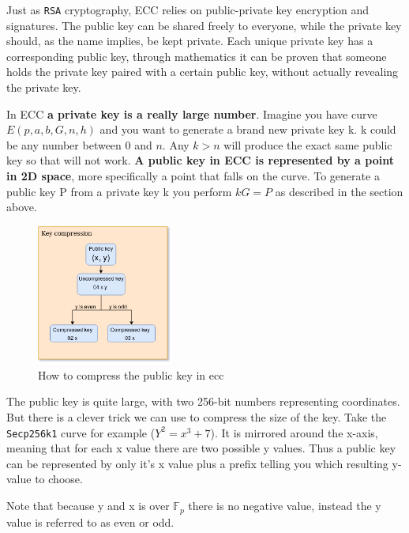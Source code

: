 Just as \texttt{RSA} cryptography, ECC relies on public-private key encryption and signatures. 
The public key can be shared freely to everyone, while the private key should, as the name implies, 
be kept private. Each unique private key has a corresponding public key, through mathematics it 
can be proven that someone holds the private key paired with a certain public key, without actually 
revealing the private key. 

In ECC \textbf{a private key is a really large number}. Imagine you have curve $E(p,a,b,G,n,h)$ 
and you want to generate a brand new private key k. k could be any number between 0 and $n$. Any 
$k > n$ will produce the exact same public key so that will not work. \textbf{A public key in ECC is 
represented by a point in 2D space}, more specifically a point that falls on the curve. To generate a 
public key P from a private key k you perform $kG = P$ as described in the section above.

\begin{figure}
	\begin{center}
		\includegraphics[width=0.4\textwidth]{background/images/key_compression.png}
	\end{center}
	\vspace{-8mm}
	\caption{How to compress the public key in ecc}
\end{figure}

The public key is quite large, with two 256-bit numbers representing coordinates. But there is a 
clever trick we can use to compress the size of the key. Take the \texttt{Secp256k1} curve for 
example ($Y^2=x^3+7$). It is mirrored around the x-axis, meaning that for each x value there 
are two possible y values. Thus a public key can be represented by only it's x value plus a 
prefix telling you which resulting y-value to choose. 

Note that because y and x is over $\mathbb{F}_{p}$ there is no negative value, instead the y 
value is referred to as even or odd. 

